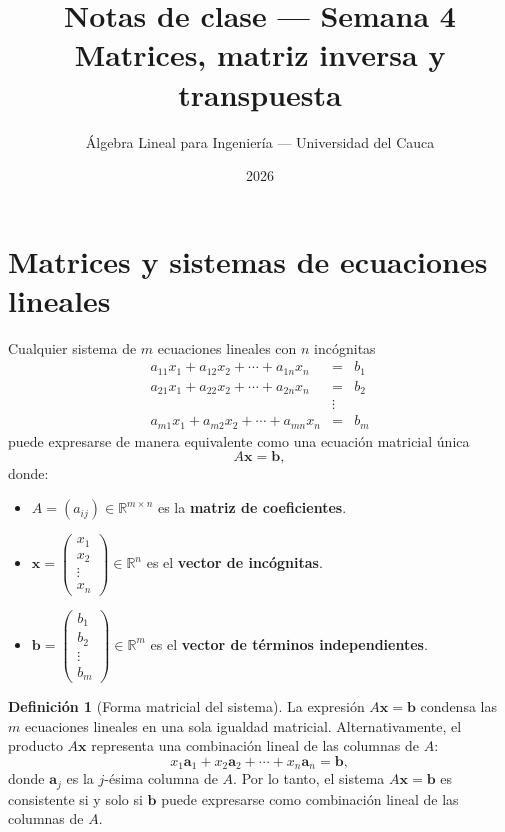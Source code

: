 \documentclass[11pt,letterpaper]{article}
\title{\textcolor{unicaucaverde}{\Large Notas de clase --- Semana 4}\\[4pt]
  \large Matrices, matriz inversa y transpuesta}
\author{Álgebra Lineal para Ingeniería --- Universidad del Cauca}
\date{2026}
\theoremstyle{definition}
\newtheorem{definicion}{Definición}[section]
\theoremstyle{plain}
\newcommand{\R}{\mathbb{R}}
\newcommand{\vv}[1]{\mathbf{#1}}
\begin{document}
\maketitle
\tableofcontents

\section{Matrices y sistemas de ecuaciones lineales}

Cualquier sistema de $m$ ecuaciones lineales con $n$ incógnitas
\[
\begin{array}{rcccl}
a_{11}x_1 + a_{12}x_2 + \cdots + a_{1n}x_n &=& b_1 \\
a_{21}x_1 + a_{22}x_2 + \cdots + a_{2n}x_n &=& b_2 \\
&\vdots& \\
a_{m1}x_1 + a_{m2}x_2 + \cdots + a_{mn}x_n &=& b_m
\end{array}
\]
puede expresarse de manera equivalente como una ecuación matricial única
\[
A\vv{x} = \vv{b},
\]
donde:
\begin{itemize}
  \item $A = (a_{ij}) \in \R^{m\times n}$ es la \textbf{matriz de coeficientes}.
  \item $\vv{x} = \begin{pmatrix} x_1 \\ x_2 \\ \vdots \\ x_n \end{pmatrix} \in \R^n$ es el \textbf{vector de incógnitas}.
  \item $\vv{b} = \begin{pmatrix} b_1 \\ b_2 \\ \vdots \\ b_m \end{pmatrix} \in \R^m$ es el \textbf{vector de términos independientes}.
\end{itemize}

\begin{definicion}[Forma matricial del sistema]
La expresión $A\vv{x}=\vv{b}$ condensa las $m$ ecuaciones lineales en una sola igualdad matricial.
Alternativamente, el producto $A\vv{x}$ representa una combinación lineal de las columnas de $A$:
\[
x_1 \vv{a}_1 + x_2 \vv{a}_2 + \cdots + x_n \vv{a}_n = \vv{b},
\]
donde $\vv{a}_j$ es la $j$-ésima columna de $A$. Por lo tanto, el sistema $A\vv{x}=\vv{b}$ es consistente
si y solo si $\vv{b}$ puede expresarse como combinación lineal de las columnas de $A$.
\end{definicion}
\end{document}
